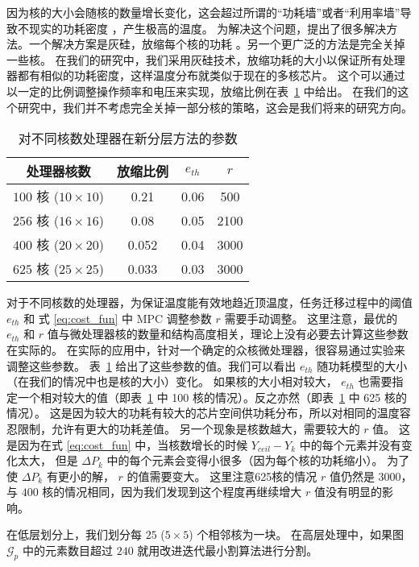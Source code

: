 因为核的大小会随核的数量增长变化，这会超过所谓的“功耗墙”或者“利用率墙”导致不现实的功耗密度  \cite{Taylor:MICRO'13} ，产生极高的温度。
为解决这个问题，提出了很多解决方法。一个解决方案是灰硅，放缩每个核的功耗  \cite{Huang:MICRO'11,Taylor:MICRO'13}。另一个更广泛的方法是完全关掉一些核\cite{Taylor:MICRO'13,Shafique:DAC'14}。
在我们的研究中，我们采用灰硅技术，放缩功耗的大小以保证所有处理器都有相似的功耗密度，这样温度分布就类似于现在的多核芯片。
这个可以通过以一定的比例调整操作频率和电压来实现，放缩比例在表~\ref{tab:param} 中给出。
在我们的这个研究中，我们并不考虑完全关掉一部分核的策略，这会是我们将来的研究方向。
\begin{table}[H]
\centering
\caption{对不同核数处理器在新分层方法的参数}\label{tab:param}{
 \begin{tabular}{|c|c|c|c|}
 \hline
 \hline
 处理器核数 &  放缩比例 & $e_{th}$ & $r$ \\
 \hline 
 \hline
 $100$ 核 ($10 \times 10$) & 0.21 & 0.06 & 500  \\
 \hline
 $256$ 核 ($16 \times 16$) & 0.08 & 0.05 & 2100 \\
 \hline
 $400$ 核 ($20 \times 20$) & 0.052 & 0.04 & 3000 \\
 \hline
 $625$ 核 ($25 \times 25$) & 0.033 & 0.03 & 3000 \\
 \hline
 \hline
 \end{tabular}
 }
 \end{table}
 
对于不同核数的处理器，为保证温度能有效地趋近顶温度，任务迁移过程中的阈值 $e_{th}$ 和 式 \eqref{eq:cost_fun} 中 MPC 调整参数 $r$ 需要手动调整。
这里注意，最优的 $e_{th}$ 和 $r$ 值与微处理器核的数量和结构高度相关，理论上没有必要去计算这些参数在实际的。
在实际的应用中，针对一个确定的众核微处理器，很容易通过实验来调整这些参数。
表~\ref{tab:param} 给出了这些参数的值。我们可以看出 $e_{th}$ 随功耗模型的大小（在我们的情况中也是核的大小）变化。
如果核的大小相对较大， $e_{th}$ 也需要指定一个相对较大的值（即表~\ref{tab:param} 中 100 核的情况）。反之亦然（即表~\ref{tab:param} 中 625 核的情况）。
这是因为较大的功耗有较大的芯片空间供功耗分布，所以对相同的温度容忍限制，允许有更大的功耗差值。
另一个现象是核数越大，需要较大的 $r$ 值。
这是因为在式 \eqref{eq:cost_fun} 中，当核数增长的时候 $Y_{ceil}-Y_k$ 中的每个元素并没有变化太大，
但是 $\Delta P_k$ 中的每个元素会变得小很多（因为每个核的功耗缩小）。
为了使 $\Delta P_k$ 有更小的解， $r$ 的值需要变大。
这里注意625核的情况 $r$ 值仍然是 $3000$，与 $400$ 核的情况相同，因为我们发现到这个程度再继续增大 $r$ 值没有明显的影响。

在低层划分上，我们划分每 $25$ ($5 \times 5$) 个相邻核为一块。
在高层处理中，如果图 $\mathcal{G}_p$ 中的元素数目超过 $240$ 就用改进迭代最小割算法进行分割。

